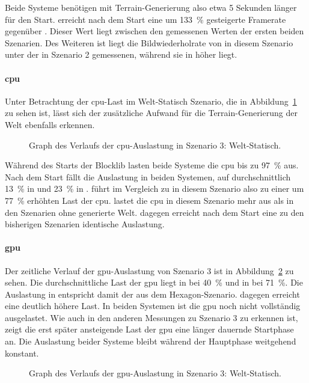 Beide Systeme benötigen mit Terrain-Generierung also etwa 5 Sekunden länger für den Start. \sysB{} erreicht nach dem Start eine um \SI{133}{\percent} gesteigerte Framerate gegenüber \sysA{}. Dieser Wert liegt zwischen den gemessenen Werten der ersten beiden Szenarien. Des Weiteren ist liegt die Bildwiederholrate von \sysA{} in diesem Szenario unter der in Szenario 2 gemessenen, während sie in \sysB{} höher liegt.

\paragraph{\ac{cpu}}
Unter Betrachtung der \ac{cpu}-Last im Welt-Statisch Szenario, die in Abbildung~\ref{fig:seed-0-static-cpu} zu sehen ist, lässt sich der zusätzliche Aufwand für die Terrain-Generierung der Welt ebenfalls erkennen.
\begin{figure}[!htbp]
	\caption[Graph des Verlaufs der -Auslastung in Szenario 3: Welt-Statisch.]{Graph des Verlaufs der \ac{cpu}-Auslastung in Szenario 3: Welt-Statisch.}\label{fig:seed-0-static-cpu}
\end{figure}
Während des Starts der Blocklib lasten beide Systeme die \ac{cpu} bis zu \SI{97}{\percent} aus. Nach dem Start fällt die Auslastung in beiden Systemen, auf durchschnittlich \SI{13}{\percent} in \sysA{} und \SI{23}{\percent} in \sysB{}.
\sysB{} führt im Vergleich zu \sysA{} in diesem Szenario also zu einer um \SI{77}{\percent} erhöhten Last der \ac{cpu}. \sysB{} lastet die \ac{cpu} in diesem Szenario mehr aus als in den Szenarien ohne generierte Welt. \sysA{} dagegen erreicht nach dem Start eine zu den bisherigen Szenarien identische Auslastung.

\paragraph{\ac{gpu}}
Der zeitliche Verlauf der \ac{gpu}-Auslastung von Szenario 3 ist in Abbildung~\ref{fig:seed-0-static-gpu} zu sehen. Die durchschnittliche Last der \ac{gpu} liegt in \sysA{} bei \SI{40}{\percent} und in \sysB{} bei \SI{71}{\percent}. Die Auslastung in \sysA{} entspricht damit der aus dem Hexagon-Szenario. \sysB{} dagegen erreicht eine deutlich höhere Last. In beiden Systemen ist die \ac{gpu} noch nicht vollständig ausgelastet. Wie auch in den anderen Messungen zu Szenario 3 zu erkennen ist, zeigt die erst später ansteigende Last der \ac{gpu} eine länger dauernde Startphase an. Die Auslastung beider Systeme bleibt während der Hauptphase weitgehend konstant.
\begin{figure}[!htbp]
	\caption[Graph des Verlaufs der -Auslastung in Szenario 3: Welt-Statisch.]{Graph des Verlaufs der \ac{gpu}-Auslastung in Szenario 3: Welt-Statisch.}\label{fig:seed-0-static-gpu}
\end{figure}

